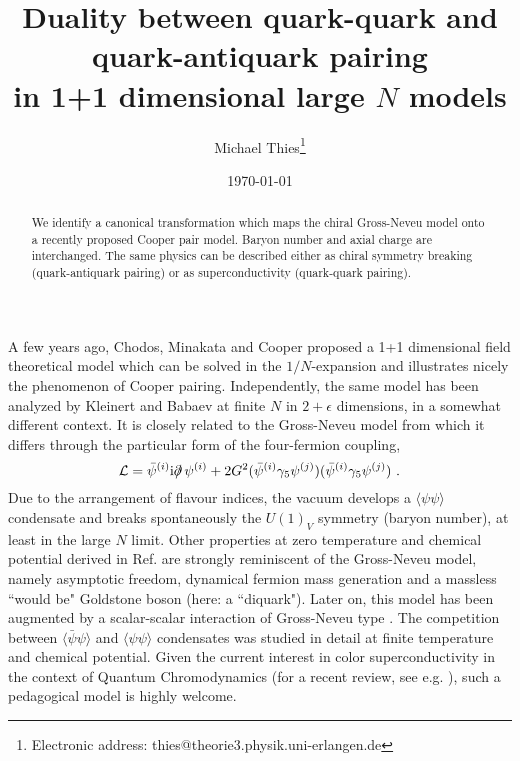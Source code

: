 \documentclass[a4paper,twocolumn,aps]{revtex4}
\begin{document}
 
\title{Duality between quark-quark and quark-antiquark pairing \\ in 1+1 dimensional large $N$ models}  
\author{Michael Thies\footnote{Electronic address: thies@theorie3.physik.uni-erlangen.de}} 
\address{Institut f\"ur Theoretische Physik III\\ 
Universit\"at Erlangen-N\"urnberg\\ 
Staudtstra\ss e 7\\ 
D-91058 Erlangen\\ 
Germany} 
\date{\today} 
\begin{abstract}
We identify a canonical transformation which maps the chiral Gross-Neveu model onto a recently
proposed Cooper pair model. Baryon number and axial charge are interchanged. The same physics
can be described either as chiral symmetry breaking (quark-antiquark pairing) or as superconductivity
(quark-quark pairing).
\end{abstract} 

\maketitle 


A few years ago, Chodos, Minakata and Cooper \cite{R1} proposed a 1+1 dimensional field theoretical
model which can be solved in the $1/N$-expansion and illustrates nicely the phenomenon of Cooper pairing.
Independently, the same model has been analyzed by Kleinert and Babaev \cite{R1a} at finite $N$ in
$2+\epsilon$ dimensions, in a somewhat different context.
It is closely related to the Gross-Neveu model \cite{R2} from which it differs through
the particular form of the four-fermion coupling,
\begin{equation}
{\cal L} = \bar{\psi}^{(i)} {\rm i} \partial \!\!\!/ \,\psi^{(i)} +
2 G^2 (\bar{\psi}^{(i)} \gamma_5 \psi^{(j)})  (\bar{\psi}^{(i)} \gamma_5 \psi^{(j)}) \ .
\label{eq1p}
\end{equation}
Due to the arrangement of flavour indices, the vacuum develops a $\langle \psi \psi \rangle$
condensate and breaks spontaneously the $U(1)_V$ symmetry (baryon number),
at least in the large $N$ limit. 
Other properties
at zero temperature and chemical potential derived in Ref. \cite{R1} are strongly reminiscent of the
Gross-Neveu model, 
namely asymptotic freedom, dynamical fermion mass generation and a massless ``would be" Goldstone boson
(here: a ``diquark").
Later on, this model has been augmented by a scalar-scalar interaction of  
Gross-Neveu type \cite{R4}. The competition between $\langle \bar{\psi} \psi \rangle$
and $\langle \psi \psi \rangle$ condensates was studied in detail at finite temperature and
chemical potential. Given the current interest in color superconductivity in
the context of Quantum Chromodynamics (for a recent review, see e.g. \cite{R5}), such a
pedagogical model is highly welcome.
\end{document}
